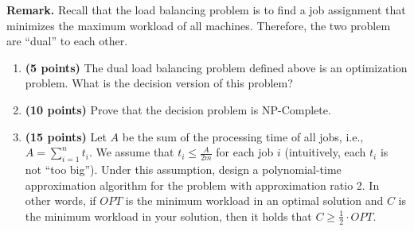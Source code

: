 \documentclass[paper=a4, fontsize=11pt]{scrartcl} %
\numberwithin{figure}{section} %
\numberwithin{table}{section} %
\begin{document}
\begin{enumerate}
\textbf{Remark.} Recall that the load balancing problem is to find a job assignment that minimizes
the maximum workload of all machines. Therefore, the two problem are \enquote{dual} to each other.
\begin{enumerate}
\item \textbf{(5 points)} The dual load balancing problem defined above is an optimization problem.
What is the decision version of this problem?
\item \textbf{(10 points)} Prove that the decision problem is NP-Complete.
\item \textbf{(15 points)} Let $A$ be the sum of the processing time of all jobs, i.e., $A = \sum\limits_{i=1}^n t_i$. We assume that $t_i \leq \frac{A}{2m}$ for each job $i$ (intuitively, each $t_i$ is not \enquote{too big}). Under this assumption, design a polynomial-time approximation algorithm for the problem with
approximation ratio 2. In other words, if $OPT$ is the minimum workload in an optimal
solution and $C$ is the minimum workload in your solution, then it holds that $C \geq \frac{1}{2} \cdot OPT$.
\end{enumerate}
\end{enumerate}

\end{document}
